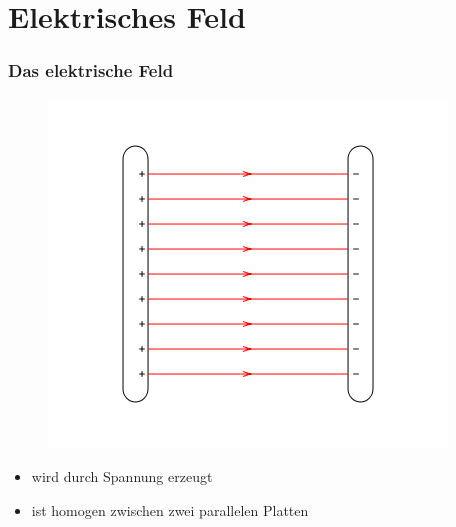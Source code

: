 

\subtitle{Technik Klasse E 08: \\
  Elektromagnetisches Feld \\[2em]}
\date{Stand 18.09.2017}


\section*{Elektrisches Feld}
\begin{frame}
  \frametitle{Das elektrische Feld}
  \begin{center}
    \begin{figure}
      \includegraphics[width=\textwidth,height=.6\textheight,keepaspectratio]{e08/PlattenkondensatorFeld.png}
    \end{figure}
    \begin{itemize}
      \item wird durch Spannung erzeugt
      \item ist homogen zwischen zwei parallelen Platten
    \end{itemize}
  \end{center}
\end{frame}

